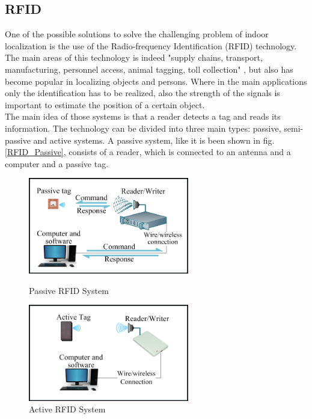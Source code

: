 \subsection{RFID} %
One of the possible solutions to solve the challenging problem of indoor localization is the use of the Radio-frequency Identification (RFID) technology. The main areas of this technology is indeed "supply chains, transport, manufacturing, personnel access, animal tagging, toll collection" \cite{Bai_overviewof},  but also has become popular in localizing objects and persons. Where in the main applications only the identification has to be realized, also the strength of the signals is important to estimate the position of a certain object.\\
The main idea of those systems is that a reader detects a tag and reads its information. The technology can be divided into three main types: passive, semi-passive and active systems. A passive system, like it is been shown in fig. \ref{RFID_Passive}, consists of a reader, which is connected to an antenna and a computer and a passive tag.\\
\begin{figure}[!htbp]
\centering
\begin{minipage}{.5\textwidth}
\centering
\includegraphics[width = 7cm]{Pictures/RFID_Passive}%
\caption[Passive RFID System]{Passive RFID System \footnotemark}
\label{RFID_Passive}
\end{minipage}%
\begin{minipage}{.5\textwidth}
\centering
\includegraphics[width = 7cm]{Pictures/RFID_Active}%
\caption[Active RFID System]{Active RFID System \footnotemark[2]}
\label{RFID_Active}
\end{minipage}
\end{figure}\\
